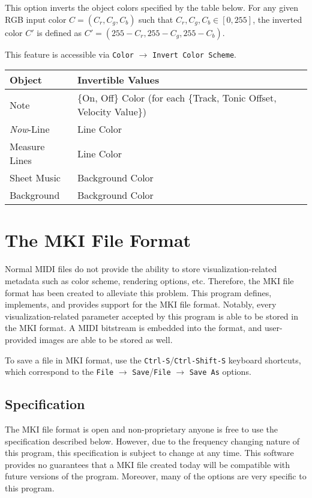 \documentclass[english]{article}
\makeatletter
\newenvironment{restoretext}%
    {\@parboxrestore%
     \begin{adjustwidth}{}{\leftmargin}%
    }{\end{adjustwidth}
     }
\def\rcbegin{\begin{restoretext}\centering}
\def\rcend{\end{restoretext}}
\providecommand{\mi}[1]{\texttt{#1}}
\makeatother
\begin{document}
This option inverts the object colors specified by the table below. For any given RGB input color 
$C= (C_r,C_g,C_b)$ such that $C_r,C_g,C_b \in [0,255]$, the inverted color $C'$ is defined as 
$C' = (255-C_r, 255-C_g, 255-C_b)$.

This feature is accessible via 
\mi{Color} $\rightarrow$ \mi{Invert Color Scheme}.

\vspace{1em}

\rcbegin
\begin{tabular}{|l|l|}
  \hline
  \textbf{Object}         & \textbf{Invertible Values} \\
  \hline
  Note                    & \{On, Off\} Color (for each \{Track, Tonic Offset, Velocity Value\})\\
  \textit{Now}-Line       & Line Color \\
  Measure Lines           & Line Color \\
  Sheet Music             & Background Color \\
  Background              & Background Color \\
  \hline
\end{tabular}
\rcend

\newpage

\section{The MKI File Format}

Normal MIDI files do not provide the ability to store visualization-related metadata such as color scheme,
rendering options, etc. Therefore, the MKI file format has been created to alleviate this problem.
This program defines, implements, and provides support for the MKI file format. Notably, every visualization-related
parameter accepted by this program is able to be stored in the MKI format. A MIDI bitstream is embedded into the format,
and user-provided images are able to be stored as well.

To save a file in MKI format, use the \mi{Ctrl-S}/\mi{Ctrl-Shift-S} keyboard shortcuts, which correspond to the 
\mi{File} $\rightarrow$ \mi{Save}/\mi{File} $\rightarrow$ \mi{Save As}
options.

\subsection{Specification}

The MKI file format is open and non-proprietary \textendash{} anyone is free to use the specification described below. However,
due to the frequency changing nature of this program, this specification is subject to change at any time. This software
provides no guarantees that a MKI file created today will be compatible with future versions of the program. Moreover,
many of the options are very specific to this program.
\end{document}
